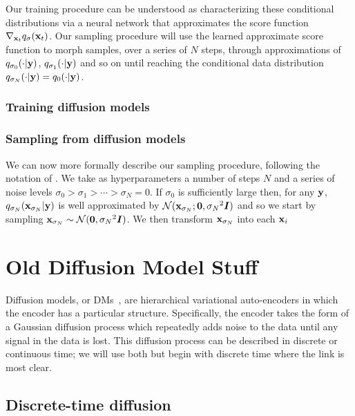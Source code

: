 Our training procedure can be understood as characterizing these conditional distributions via a neural network that approximates the score function $\nabla_{{\mathbf{x}}_t} q_\sigma({\mathbf{x}}_t)$. Our sampling procedure will use the learned approximate score function to morph samples, over a series of $N$ steps, through approximations of $q_{\sigma_0}(\cdot | {\mathbf{y}})$, $q_{\sigma_1}(\cdot | {\mathbf{y}})$ and so on until reaching the conditional data distribution $q_{\sigma_N}(\cdot | {\mathbf{y}}) = q_{0}(\cdot | {\mathbf{y}})$. 

\subsection{Training diffusion models}

\subsection{Sampling from diffusion models}

We can now more formally describe our sampling procedure, following the notation of \citet{karras2022elucidating}. We take as hyperparameters a number of steps $N$ and a series of noise levels $\sigma_0 > \sigma_1 > \cdots > \sigma_N = 0$. If $\sigma_0$ is sufficiently large then, for any ${\mathbf{y}}$, $q_{\sigma_N}({\mathbf{x}}_{\sigma_N}|{\mathbf{y}}) $ is well approximated by ${\mathcal{N}}({\mathbf{x}}_{\sigma_N} ; {\bm{0}}, {\sigma_N}^2{\bm{I}})$ and so we start by sampling ${\mathbf{x}}_{\sigma_N} \sim {\mathcal{N}}({\bm{0}}, {\sigma_N}^2{\bm{I}})$. We then transform ${\mathbf{x}}_{\sigma_N}$ into each ${\mathbf{x}}_i$



\chapter{Old Diffusion Model Stuff}

Diffusion models, or DMs~\citep{sohl2015deep,ho2020denoising,nichol2021improved,song2020score}, are hierarchical variational auto-encoders in which the encoder has a particular structure. Specifically, the encoder takes the form of a Gaussian diffusion process which repeatedly adds noise to the data until any signal in the data is lost. This diffusion process can be described in discrete or continuous time; we will use both but begin with discrete time where the link is most clear.

\section{Discrete-time diffusion}
